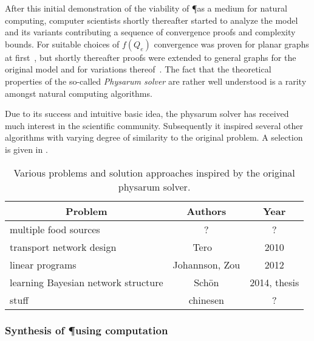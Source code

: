 			After this initial demonstration of the viability of \P as a medium for natural computing, computer scientists shortly thereafter started to analyze the model and its variants contributing a sequence of convergence proofs and complexity bounds. For suitable choices of $f(Q_e)$ convergence was proven for planar graphs at first~\cite{miyaji2007mathematical,miyaji2008physarum}, but shortly thereafter proofs were extended to general graphs for the original model and for variations thereof~\cite{Bonifaci2012121,bonifaci2013physarum,ito2011convergence,becchetti2013physarum}. The fact that the theoretical properties of the so-called \emph{Physarum solver} are rather well understood is a rarity amongst natural computing algorithms.

			Due to its success and intuitive basic idea, the physarum solver has received much interest in the scientific community. Subsequently it inspired several other algorithms with varying degree of similarity to the original problem. A selection is given in . 


			\begin{table}
				\centering
				\begin{tabular}{@{} l *2c @{}}
				\toprule
				 \multicolumn{1}{c}{Problem}    & Authors  & Year   \\ 
				\midrule
				 multiple food sources & ? & ? \\
				 transport network design & Tero \etal~\cite{tero2010rules} & 2010 \\
				 linear programs & Johannson, Zou & 2012  \\ 
				 learning Bayesian network structure & Sch\"on \etal & 2014, thesis  \\ 
				 stuff & chinesen \etal & ?  \\ 

				\bottomrule
				\end{tabular}
				\caption[Computing inspired by \P]{Various problems and solution approaches inspired by the original physarum solver.}
				\label{tab:list_inspired}
			\end{table}

		\subsubsection{Synthesis of \P using computation}

